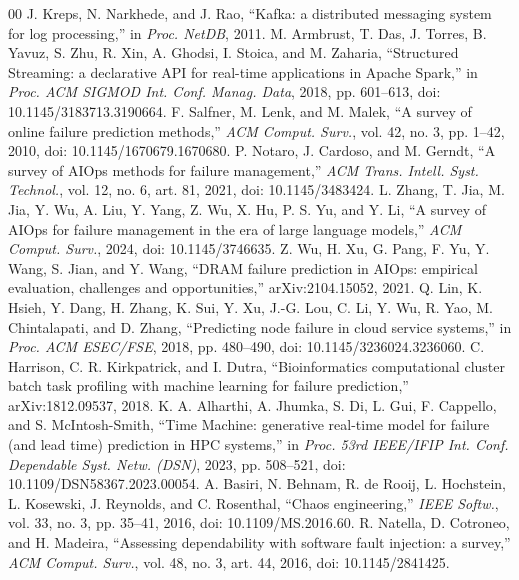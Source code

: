 \documentclass[conference]{IEEEtran}
\begin{document}
\begin{thebibliography}{00}
 J. Kreps, N. Narkhede, and J. Rao, ``Kafka: a distributed messaging system for log processing,'' in \textit{Proc. NetDB}, 2011.
 M. Armbrust, T. Das, J. Torres, B. Yavuz, S. Zhu, R. Xin, A. Ghodsi, I. Stoica, and M. Zaharia, ``Structured Streaming: a declarative API for real-time applications in Apache Spark,'' in \textit{Proc. ACM SIGMOD Int. Conf. Manag. Data}, 2018, pp. 601--613, doi: 10.1145/3183713.3190664.
 F. Salfner, M. Lenk, and M. Malek, ``A survey of online failure prediction methods,'' \textit{ACM Comput. Surv.}, vol. 42, no. 3, pp. 1--42, 2010, doi: 10.1145/1670679.1670680.
 P. Notaro, J. Cardoso, and M. Gerndt, ``A survey of AIOps methods for failure management,'' \textit{ACM Trans. Intell. Syst. Technol.}, vol. 12, no. 6, art. 81, 2021, doi: 10.1145/3483424.
 L. Zhang, T. Jia, M. Jia, Y. Wu, A. Liu, Y. Yang, Z. Wu, X. Hu, P. S. Yu, and Y. Li, ``A survey of AIOps for failure management in the era of large language models,'' \textit{ACM Comput. Surv.}, 2024, doi: 10.1145/3746635.
 Z. Wu, H. Xu, G. Pang, F. Yu, Y. Wang, S. Jian, and Y. Wang, ``DRAM failure prediction in AIOps: empirical evaluation, challenges and opportunities,'' arXiv:2104.15052, 2021.
 Q. Lin, K. Hsieh, Y. Dang, H. Zhang, K. Sui, Y. Xu, J.-G. Lou, C. Li, Y. Wu, R. Yao, M. Chintalapati, and D. Zhang, ``Predicting node failure in cloud service systems,'' in \textit{Proc. ACM ESEC/FSE}, 2018, pp. 480--490, doi: 10.1145/3236024.3236060.
 C. Harrison, C. R. Kirkpatrick, and I. Dutra, ``Bioinformatics computational cluster batch task profiling with machine learning for failure prediction,'' arXiv:1812.09537, 2018.
 K. A. Alharthi, A. Jhumka, S. Di, L. Gui, F. Cappello, and S. McIntosh-Smith, ``Time Machine: generative real-time model for failure (and lead time) prediction in HPC systems,'' in \textit{Proc. 53rd IEEE/IFIP Int. Conf. Dependable Syst. Netw. (DSN)}, 2023, pp. 508--521, doi: 10.1109/DSN58367.2023.00054.
 A. Basiri, N. Behnam, R. de Rooij, L. Hochstein, L. Kosewski, J. Reynolds, and C. Rosenthal, ``Chaos engineering,'' \textit{IEEE Softw.}, vol. 33, no. 3, pp. 35--41, 2016, doi: 10.1109/MS.2016.60.
 R. Natella, D. Cotroneo, and H. Madeira, ``Assessing dependability with software fault injection: a survey,'' \textit{ACM Comput. Surv.}, vol. 48, no. 3, art. 44, 2016, doi: 10.1145/2841425.

\end{thebibliography}
\end{document}
